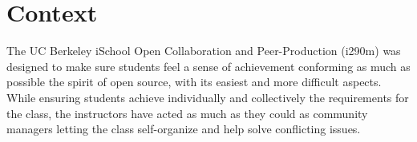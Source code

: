 \section{Context}
The  UC Berkeley iSchool Open Collaboration and Peer-Production (i290m) was designed to make sure students feel a sense of achievement conforming as much as possible the spirit of open source, with its easiest and more difficult aspects. While ensuring students achieve individually and collectively the requirements for the class, the instructors have acted as much as they could as community managers letting the class self-organize and help solve conflicting issues.


%

